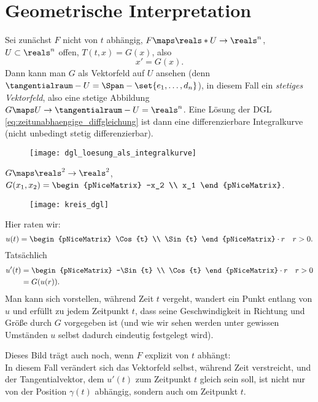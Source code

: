 \section{Geometrische Interpretation}
Sei zunächst \( F \) nicht von \( t \) abhängig, \( F\maps \reals*U\to \reals^n \), \( U\subset \reals^n \) offen, \( T(t,x)=G(x) \), also
\begin{equation*}
  x'=G(x)\tag{\(**\)}\label{eq:zeitunabhaengige_diffgleichung}.
\end{equation*}
Dann kann man \( G \) als Vektorfeld auf \( U \) ansehen (denn \( \tangentialraum-{U}=\Span-{\set{e_1,\dotsc,d_n}} \)), in diesem Fall ein \emph{stetiges Vektorfeld}, also eine stetige Abbildung \( G\maps  U \to \tangentialraum-{U}=\reals^n \). Eine Lösung der DGL \eqref{eq:zeitunabhaengige_diffgleichung} ist dann eine differenzierbare Integralkurve (nicht unbedingt stetig differenzierbar).
\begin{figure}[H]
  \centering
  \texttt{[image: dgl\_loesung\_als\_integralkurve]}
  \label{fig:dgl_loesung_als_integralkurve}
\end{figure}
\begin{beispiel*}
  \( G\maps \reals^2\to \reals^2 \), \( G(x_1,x_2)=\begin{pNiceMatrix} -x_2 \\ x_1 \end{pNiceMatrix} \).
  \begin{figure}[H]
    \centering
    \texttt{[image: kreis\_dgl]}
    \label{fig:kreis_dgl}
  \end{figure}
  Hier raten wir:
  \begin{equation*}
    u(t)=\begin{pNiceMatrix} \Cos{t} \\ \Sin{t} \end{pNiceMatrix}\cdot r\quad r>0.
  \end{equation*}
  Tatsächlich
  \begin{align*}
    u'(t)&=\begin{pNiceMatrix} -\Sin{t} \\ \Cos{t} \end{pNiceMatrix}\cdot r\quad r>0\\
    &=G(u(r)).
  \end{align*}
  Man kann sich vorstellen, während Zeit \( t \) vergeht, wandert ein Punkt entlang von \( u \) und erfüllt zu jedem Zeitpunkt \( t \), dass seine Geschwindigkeit in Richtung und Größe durch \( G \) vorgegeben ist (und wie wir sehen werden unter gewissen Umständen \( u \) selbst dadurch eindeutig festgelegt wird). 
  
  Dieses Bild trägt auch noch, wenn \( F \) explizit von \( t \) abhängt:\\
  In diesem Fall verändert sich das Vektorfeld selbst, während Zeit verstreicht, und der Tangentialvektor, dem \( u'(t) \) zum Zeitpunkt \( t \) gleich sein soll, ist nicht nur von der Position \( \gamma(t) \) abhängig, sondern auch om Zeitpunkt \( t \).
\end{beispiel*}
